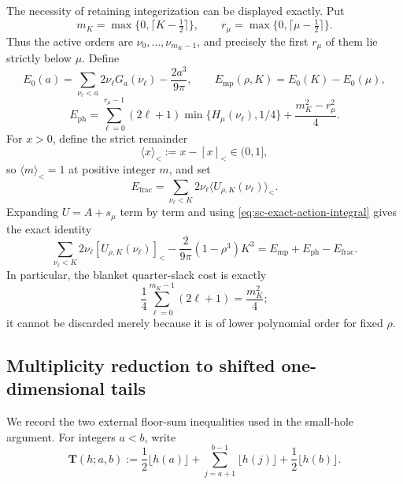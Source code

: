 \documentclass[11pt]{article}
\numberwithin{equation}{section}
\theoremstyle{definition}
\theoremstyle{remark}
\begin{document}
The necessity of retaining integerization can be displayed exactly.  Put
\[
  m_K=\max\{0,\lceil K-\tfrac12\rceil\},
  \qquad
  r_\mu=\max\{0,\lceil\mu-\tfrac12\rceil\}.
\]
Thus the active orders are \(\nu_0,\ldots,\nu_{m_K-1}\), and precisely the
first \(r_\mu\) of them lie strictly below \(\mu\).  Define
\[
  E_0(a)=\sum_{\nu_\ell<a}2\nu_\ell G_a(\nu_\ell)
  -\frac{2a^3}{9\pi},
  \qquad
  E_{\mathrm{mp}}(\rho,K)=E_0(K)-E_0(\mu),
\]
\[
  E_{\mathrm{ph}}
  =\sum_{\ell=0}^{r_\mu-1}(2\ell+1)
  \min\{H_\mu(\nu_\ell),1/4\}
  +\frac{m_K^2-r_\mu^2}{4}.
\]
For \(x>0\), define the strict remainder
\[
  \langle x\rangle_<:=x-[x]_<\in(0,1],
\]
so \(\langle m\rangle_<=1\) at positive integer \(m\), and set
\[
  E_{\mathrm{frac}}
  =\sum_{\nu_\ell<K}2\nu_\ell
  \langle U_{\rho,K}(\nu_\ell)\rangle_<.
\]
Expanding \(U=A+s_\mu\) term by term and using
\eqref{eq:sc-exact-action-integral} gives the exact identity
\begin{equation}
  \sum_{\nu_\ell<K}2\nu_\ell[U_{\rho,K}(\nu_\ell)]_<
  -\frac{2}{9\pi}(1-\rho^3)K^3
  =E_{\mathrm{mp}}+E_{\mathrm{ph}}-E_{\mathrm{frac}}.
  \label{eq:sc-fractional-budget}
\end{equation}
In particular, the blanket quarter-slack cost is exactly
\[
  \frac14\sum_{\ell=0}^{m_K-1}(2\ell+1)=\frac{m_K^2}{4};
\]
it cannot be discarded merely because it is of lower polynomial order for
fixed \(\rho\).

\subsection{Multiplicity reduction to shifted one-dimensional tails}

We record the two external floor-sum inequalities used in the small-hole
argument.  For integers \(a<b\), write
\begin{equation}
  \mathbf T(h;a,b)
  :=\frac12\lfloor h(a)\rfloor
  +\sum_{j=a+1}^{b-1}\lfloor h(j)\rfloor
  +\frac12\lfloor h(b)\rfloor.
  \label{eq:sc-trapezoidal-floor}
\end{equation}
\end{document}
